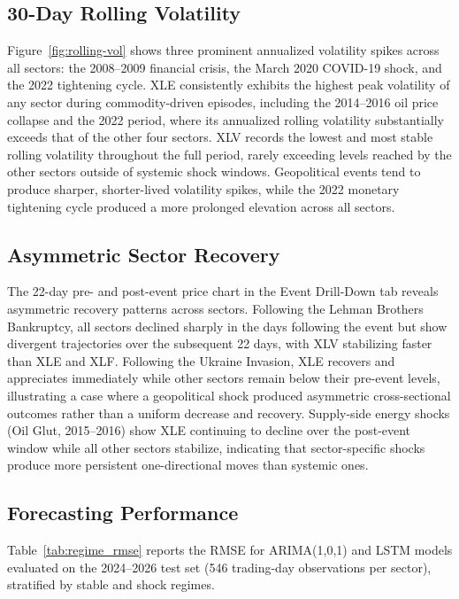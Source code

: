 \documentclass[12pt]{article}
\begin{document}
\subsection{30-Day Rolling Volatility}

Figure~\ref{fig:rolling-vol} shows three prominent annualized volatility spikes across all sectors: the 2008--2009 financial crisis, the March 2020 COVID-19 shock, and the 2022 tightening cycle. XLE consistently exhibits the highest peak volatility of any sector during commodity-driven episodes, including the 2014--2016 oil price collapse and the 2022 period, where its annualized rolling volatility substantially exceeds that of the other four sectors. XLV records the lowest and most stable rolling volatility throughout the full period, rarely exceeding levels reached by the other sectors outside of systemic shock windows. Geopolitical events tend to produce sharper, shorter-lived volatility spikes, while the 2022 monetary tightening cycle produced a more prolonged elevation across all sectors.

\subsection{Asymmetric Sector Recovery}

The 22-day pre- and post-event price chart in the Event Drill-Down tab reveals asymmetric recovery patterns across sectors. Following the Lehman Brothers Bankruptcy, all sectors declined sharply in the days following the event but show divergent trajectories over the subsequent 22 days, with XLV stabilizing faster than XLE and XLF. Following the Ukraine Invasion, XLE recovers and appreciates immediately while other sectors remain below their pre-event levels, illustrating a case where a geopolitical shock produced asymmetric cross-sectional outcomes rather than a uniform decrease and recovery. Supply-side energy shocks (Oil Glut, 2015--2016) show XLE continuing to decline over the post-event window while all other sectors stabilize, indicating that sector-specific shocks produce more persistent one-directional moves than systemic ones.

\subsection{Forecasting Performance}

Table~\ref{tab:regime_rmse} reports the RMSE for ARIMA(1,0,1) and LSTM models evaluated on the 2024--2026 test set (546 trading-day observations per sector), stratified by stable and shock regimes.
\end{document}
